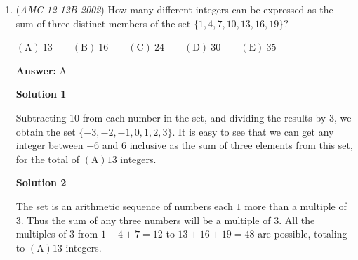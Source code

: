 \begin{enumerate}
 \textbf{Answer: }C



\textbf{Solution 1}

We can let $a=1$, $b=2$, $c=3$, and $d=4$. $\frac{a}{d}=\boxed{\frac{1}{4}}  \Longrightarrow \mathrm{(C)}$




\textbf{Solution 2}

As $a, b, d$ is a geometric sequence, let $b=ka$ and $d=k^2a$ for some $k>0$. 

 Now, $a, b, c, d$ is an arithmetic sequence. Its difference is $b-a=(k-1)a$. Thus $d=a + 3(k-1)a = (3k-2)a$.

 Comparing the two expressions for $d$ we get $k^2=3k-2$. The positive solution is $k=2$, and $\frac{a}{d}=\frac{a}{k^2a}=\frac{1}{k^2}=\boxed{\frac{1}{4}} \Longrightarrow \mathrm{(C)}$.

 



\textbf{Solution 3}

Letting $n$ be the common difference of the arithmetic progression, we have$b = a + n$, $c = a + 2n$, $d = a + 3n$. We are given that $b / a$ = $d / b$, or
 \[\frac{a + n}{a} = \frac{a + 3n}{a + n}.\]Cross-multiplying, we get 
 \[a^2 + 2an + n^2 = a^2 + 3an\]
 \[n^2 = an\]
 \[n = a\]So $\frac{a}{d} = \frac{a}{a + 3n} = \frac{a}{4a} = \boxed{\frac{1}{4}}  \Longrightarrow \mathrm{(C)}$.

 


	\item (\textit{AMC 12 12B 2002}) How many different integers can be expressed as the sum of three distinct members of the set $\{1,4,7,10,13,16,19\}$?


 $\mathrm{(A)}\ 13 \qquad\mathrm{(B)}\ 16 \qquad\mathrm{(C)}\ 24 \qquad\mathrm{(D)}\ 30 \qquad\mathrm{(E)}\ 35$

 \textbf{Answer: }A



\textbf{Solution 1}

Subtracting 10 from each number in the set, and dividing the results by 3, we obtain the set $\{-3, -2, -1, 0, 1, 2, 3\}$.  It is easy to see that we can get any integer between $-6$ and $6$ inclusive as the sum of three elements from this set, for the total of $\boxed{\mathrm{(A) } 13}$ integers.

 



\textbf{Solution 2}

The set is an arithmetic sequence of numbers each $1$ more than a multiple of $3$. Thus the sum of any three numbers will be a multiple of $3$. All the multiples of $3$ from $1+4+7=12$ to $13+16+19=48$ are possible, totaling to $\boxed{\mathrm{(A) } 13}$ integers.


\end{enumerate}
